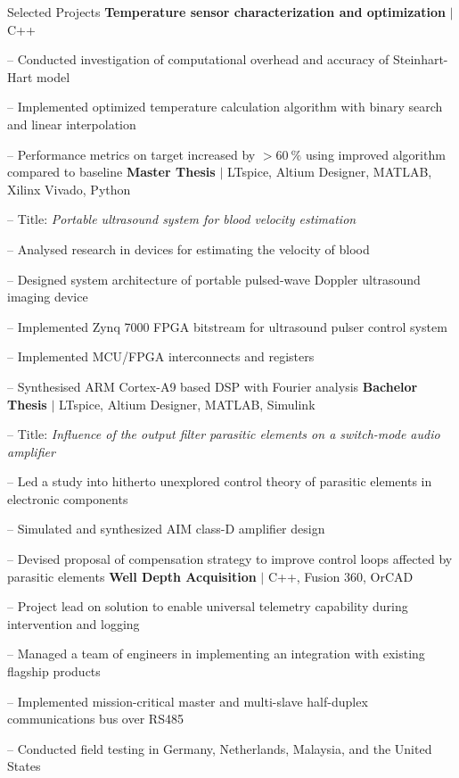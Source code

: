 \begin{rubric}{\faTasks[solid]  Selected Projects}
\entry*[2024][] \textbf{Temperature sensor characterization and optimization} $|$ C++ \par
	-- Conducted investigation of computational overhead and accuracy of Steinhart-Hart model \par
	-- Implemented optimized temperature calculation algorithm with binary search and linear interpolation \par
	-- Performance metrics on target increased by $>\qty{60}{\percent}$ using improved algorithm compared to baseline
\entry*[2023][]%
	\textbf{Master Thesis} $|$ LTspice, Altium Designer, MATLAB, Xilinx Vivado, Python \par
	-- Title: \emph{Portable ultrasound system for blood velocity estimation} \par
	-- Analysed research in devices for estimating the velocity of blood \par
	-- Designed system architecture of portable pulsed-wave Doppler ultrasound imaging device \par
	-- Implemented Zynq 7000 FPGA bitstream for ultrasound pulser control system \par
	-- Implemented MCU/FPGA interconnects and registers \par
	-- Synthesised ARM Cortex\textsuperscript{\textcopyright}-A9 based DSP with Fourier analysis
%
\entry*[2020][] \textbf{Bachelor Thesis} $|$ LTspice, Altium Designer, MATLAB, Simulink \par
	-- Title: \emph{Influence of the output filter parasitic elements on a switch-mode audio amplifier} \par
	-- Led a study into hitherto unexplored control theory of parasitic elements in electronic components \par
	-- Simulated and synthesized AIM class-D amplifier design \par
	-- Devised proposal of compensation strategy to improve control loops affected by parasitic elements
%
\entry*[2017][] \textbf{Well Depth Acquisition} $|$ C++, Fusion 360, OrCAD \par
	-- Project lead on solution to enable universal telemetry capability during intervention and logging \par
	-- Managed a team of engineers in implementing an integration with existing flagship products \par
	-- Implemented mission-critical master and multi-slave half-duplex communications bus over RS485 \par
	-- Conducted field testing in Germany, Netherlands, Malaysia, and the United States
%
\end{rubric}